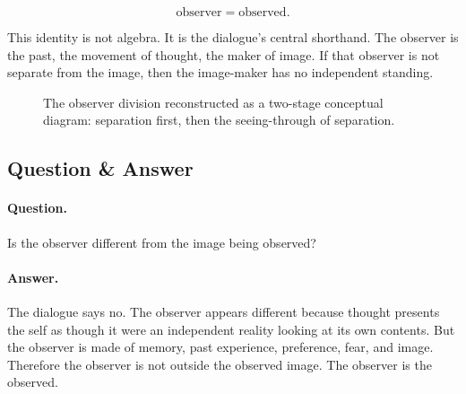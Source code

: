 \begin{equation}
\text{observer} = \text{observed}.
\end{equation}

This identity is not algebra. It is the dialogue's central shorthand. The observer is the past, the movement of thought, the maker of image. If that observer is not separate from the image, then the image-maker has no independent standing.

\begin{figure}
\centering
{}
\caption{The observer division reconstructed as a two-stage conceptual diagram: separation first, then the seeing-through of separation.}
\end{figure}

\subsection{Question \& Answer}

\paragraph{Question.}
Is the observer different from the image being observed?

\paragraph{Answer.}
The dialogue says no. The observer appears different because thought presents the self as though it were an independent reality looking at its own contents. But the observer is made of memory, past experience, preference, fear, and image. Therefore the observer is not outside the observed image. The observer is the observed.

